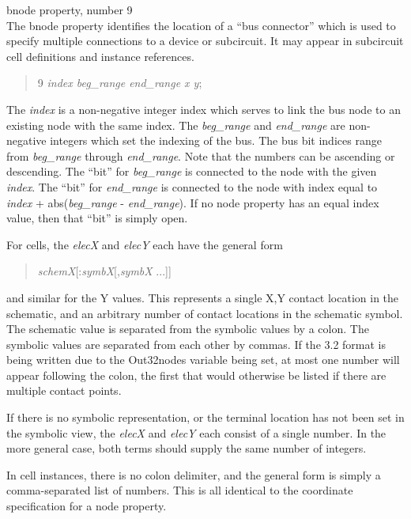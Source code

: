 \begin{description}
\item{\et bnode} property, number 9\\
The {\et bnode} property identifies the location of a ``bus
connector'' which is used to specify multiple connections to a device
or subcircuit.  It may appear in subcircuit cell definitions and
instance references.

\begin{quote}{ 9} {\it index beg\_range end\_range x y};
\end{quote}

The {\it index} is a non-negative integer index which serves to link
the bus node to an existing node with the same index.  The {\it
beg\_range} and {\it end\_range} are non-negative integers which set
the indexing of the bus.  The bus bit indices range from {\it
beg\_range} through {\it end\_range}.  Note that the numbers can be
ascending or descending.  The ``bit'' for {\it beg\_range} is
connected to the node with the given {\it index}.  The ``bit'' for
{\it end\_range} is connected to the node with index equal to {\it
index} + {\vt abs(}{\it beg\_range} - {\it end\_range\/}{\vt )}.  If
no node property has an equal index value, then that ``bit'' is simply
open.

For cells, the {\it elecX} and {\it elecY} each have the general form
\begin{quote}
{\it schemX\/}[{\vt :}{\it symbX\/}[{\vt ,}{\it symbX} ...]]
\end{quote}
and similar for the Y values.  This represents a single X,Y contact
location in the schematic, and an arbitrary number of contact
locations in the schematic symbol.  The schematic value is separated
from the symbolic values by a colon.  The symbolic values are
separated from each other by commas.  If the 3.2 format is being
written due to the {\et Out32nodes} variable being set, at most one
number will appear following the colon, the first that would otherwise
be listed if there are multiple contact points.

If there is no symbolic representation, or the terminal location has
not been set in the symbolic view, the {\it elecX} and {\it elecY}
each consist of a single number.  In the more general case, both terms
should supply the same number of integers.

In cell instances, there is no colon delimiter, and the general form
is simply a comma-separated list of numbers.  This is all identical to
the coordinate specification for a {\et node} property.


\end{description}
